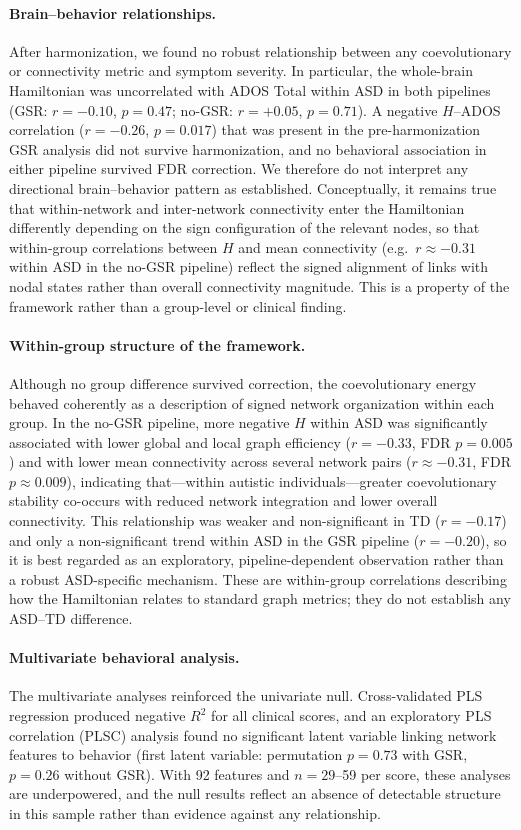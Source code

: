 \documentclass[10pt,letterpaper]{article}
\begin{document}
\paragraph*{Brain--behavior relationships.}
After harmonization, we found no robust relationship between any coevolutionary or connectivity
metric and symptom severity. In particular, the whole-brain Hamiltonian was uncorrelated with ADOS
Total within ASD in both pipelines (GSR: $r = -0.10$, $p = 0.47$; no-GSR: $r = +0.05$, $p = 0.71$).
A negative $H$--ADOS correlation ($r = -0.26$, $p = 0.017$) that was present in the pre-harmonization
GSR analysis did not survive harmonization, and no behavioral association in either pipeline survived
FDR correction. We therefore do not interpret any directional brain--behavior pattern as established.
Conceptually, it remains true that within-network and inter-network connectivity enter the
Hamiltonian differently depending on the sign configuration of the relevant nodes, so that
within-group correlations between $H$ and mean connectivity (e.g.\ $r \approx -0.31$ within ASD in
the no-GSR pipeline) reflect the signed alignment of links with nodal states rather than overall
connectivity magnitude. This is a property of the framework rather than a group-level or
clinical finding.

\paragraph*{Within-group structure of the framework.}
Although no group difference survived correction, the coevolutionary energy behaved coherently as a
description of signed network organization within each group. In the no-GSR pipeline, more negative
$H$ within ASD was significantly associated with lower global and local graph efficiency
($r = -0.33$, FDR $p = 0.005$) and with lower mean connectivity across several network pairs
($r \approx -0.31$, FDR $p \approx 0.009$), indicating that---within autistic individuals---greater
coevolutionary stability co-occurs with reduced network integration and lower overall connectivity.
This relationship was weaker and non-significant in TD ($r = -0.17$) and only a non-significant trend
within ASD in the GSR pipeline ($r = -0.20$), so it is best regarded as an exploratory,
pipeline-dependent observation rather than a robust ASD-specific mechanism. These are within-group
correlations describing how the Hamiltonian relates to standard graph metrics; they do not establish
any ASD--TD difference.

\paragraph*{Multivariate behavioral analysis.}
The multivariate analyses reinforced the univariate null. Cross-validated PLS regression produced
negative $R^2$ for all clinical scores, and an exploratory PLS correlation (PLSC) analysis found no
significant latent variable linking network features to behavior (first latent variable: permutation
$p = 0.73$ with GSR, $p = 0.26$ without GSR). With 92 features and $n = 29$--59 per score, these
analyses are underpowered, and the null results reflect an absence of detectable structure in this
sample rather than evidence against any relationship.
\end{document}
